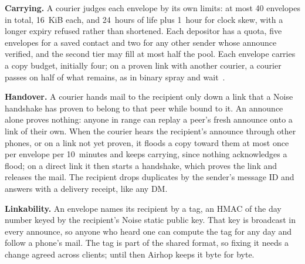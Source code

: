 \documentclass[conference]{IEEEtran}
\begin{document}
\textbf{Carrying.} A courier judges each envelope by its own limits: at most 40 envelopes in total, 16~KiB each, and 24~hours of life plus 1~hour for clock skew, with a longer expiry refused rather than shortened. Each depositor has a quota, five envelopes for a saved contact and two for any other sender whose announce verified, and the second tier may fill at most half the pool. Each envelope carries a copy budget, initially four; on a proven link with another courier, a courier passes on half of what remains, as in binary spray and wait~\cite{spyropoulos2005}.

\textbf{Handover.} A courier hands mail to the recipient only down a link that a Noise handshake has proven to belong to that peer while bound to it. An announce alone proves nothing: anyone in range can replay a peer's fresh announce onto a link of their own. When the courier hears the recipient's announce through other phones, or on a link not yet proven, it floods a copy toward them at most once per envelope per 10~minutes and keeps carrying, since nothing acknowledges a flood; on a direct link it then starts a handshake, which proves the link and releases the mail. The recipient drops duplicates by the sender's message ID and answers with a delivery receipt, like any DM.

\textbf{Linkability.} An envelope names its recipient by a tag, an HMAC of the day number keyed by the recipient's Noise static public key. That key is broadcast in every announce, so anyone who heard one can compute the tag for any day and follow a phone's mail. The tag is part of the shared format, so fixing it needs a change agreed across clients; until then Airhop keeps it byte for byte.
\end{document}
